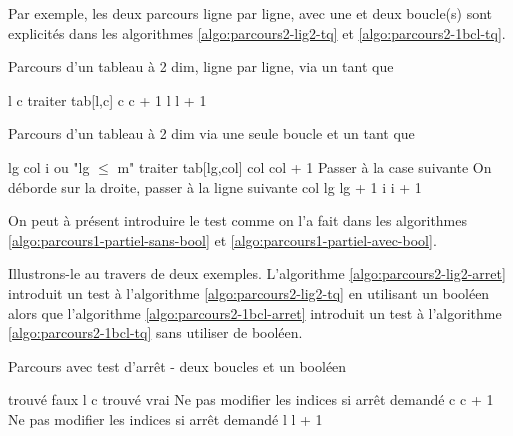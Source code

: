 Par exemple, les deux parcours ligne par ligne, avec une et deux boucle(s)
sont explicités dans les algorithmes \vref{algo:parcours2-lig2-tq}
et \vref{algo:parcours2-1bcl-tq}.

\begin{algorithm}[H]
\begin{pseudo}
	\caption{Parcours d'un tableau à 2 dim, ligne par ligne, via un tant que}
	\label{algo:parcours2-lig2-tq}
	\Let l 
		\Let c 
			\Stmt traiter tab[l,c]
			\Let c \Gets c + 1
		\EndWhile
		\Let l \Gets l + 1
	\EndWhile
\end{pseudo}
\end{algorithm}

\begin{algorithm}[H]
\begin{pseudo}
	\caption{Parcours d'un tableau à 2 dim via une seule boucle et un tant que}
	\label{algo:parcours2-1bcl-tq}
	\Let lg 
	\Let col 
	\Let i 
	 \RComment ou "lg $\le$ m" 
		\Stmt traiter tab[lg,col]
		\Let col \Gets col + 1	\RComment Passer à la case suivante
		 \RComment On déborde sur la droite, passer à la ligne suivante
			\Let col 
			\Let lg \Gets lg + 1
		\EndIf
		\Let i \Gets i + 1		
	\EndWhile
\end{pseudo}
\end{algorithm}

On peut à présent introduire le test comme on l'a fait 
dans les algorithmes \vref{algo:parcours1-partiel-sans-bool}
et \vref{algo:parcours1-partiel-avec-bool}.

Illustrons-le au travers de deux exemples.
L'algorithme \vref{algo:parcours2-lig2-arret} introduit un test 
à l'algorithme \vref{algo:parcours2-lig2-tq} en utilisant un booléen
alors que l'algorithme \vref{algo:parcours2-1bcl-arret} introduit un test
à l'algorithme \vref{algo:parcours2-1bcl-tq} sans utiliser de booléen.

\begin{algorithm}[H]
\begin{pseudo}
	\caption{Parcours avec test d'arrêt - deux boucles et un booléen}
	\label{algo:parcours2-lig2-arret}
	\Let trouvé \Gets faux
	\Let l 
		\Let c 
				\Let trouvé \Gets vrai
			\Else \RComment Ne pas modifier les indices si arrêt demandé
				\Let c \Gets c + 1
			\EndIf
		\EndWhile
		 \RComment Ne pas modifier les indices si arrêt demandé
			\Let l \Gets l + 1
		\EndIf
	\EndWhile
\end{pseudo}
\end{algorithm}


